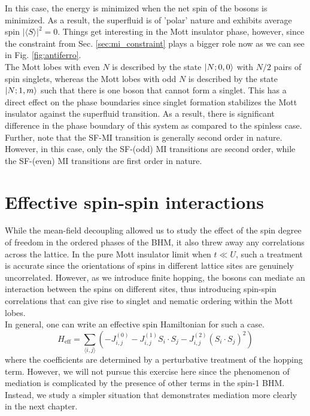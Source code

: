 In this case, the energy is minimized when the net spin of the bosons is minimized. As a result, the superfluid is of 'polar' nature and exhibits average spin $|\langle S \rangle|^2 = 0$. Things get interesting in the Mott insulator phase, however, since the constraint from Sec. \ref{sec:mi_constraint} plays a bigger role now as we can see in Fig. \ref{fig:antiferro}. 
\vspace{0.5cm}\\
The Mott lobes with even $N$ is described by the state $\ket{N; 0, 0}$ with $N/2$ pairs of spin singlets, whereas the Mott lobes with odd $N$ is described by the state $\ket{N;1, m}$ such that there is one boson that cannot form a singlet. This has a direct effect on the phase boundaries since singlet formation stabilizes the Mott insulator against the superfluid transition\cite{Tsuchiya_2004}. As a result, there is significant difference in the phase boundary of this system as compared to the spinless case. Further, note that the SF-MI transition is generally second order in nature. However, in this case, only the SF-(odd) MI transitions are second order, while the SF-(even) MI transitions are first order in nature.  

\section{Effective spin-spin interactions}
While the mean-field decoupling allowed us to study the effect of the spin degree of freedom in the ordered phases of the BHM, it also threw away any correlations across the lattice. In the pure Mott insulator limit when $t \ll U$, such a treatment is accurate since the orientations of spins in different lattice sites are genuinely uncorrelated. However, as we introduce finite hopping, the bosons can mediate an interaction between the spins on different sites, thus introducing spin-spin correlations that can give rise to singlet and nematic ordering within the Mott lobes. 
\vspace{0.5cm}\\
In general, one can write an effective spin Hamiltonian for such a case\cite{Tsuchiya_2004}.
\begin{equation}
    H_{\text{eff}} = \sum_{\langle i, j\rangle} (-J_{i, j}^{(0)} - J_{i, j}^{(1)} S_i \cdot S_j - J_{i, j}^{(2)} (S_i \cdot S_j)^2)
\end{equation}
where the coefficients are determined by a perturbative treatment of the hopping term. However, we will not pursue this exercise here since the phenomenon of mediation is complicated by the presence of other terms in the spin-1 BHM. Instead, we study a simpler situation that demonstrates mediation more clearly in the next chapter.   

